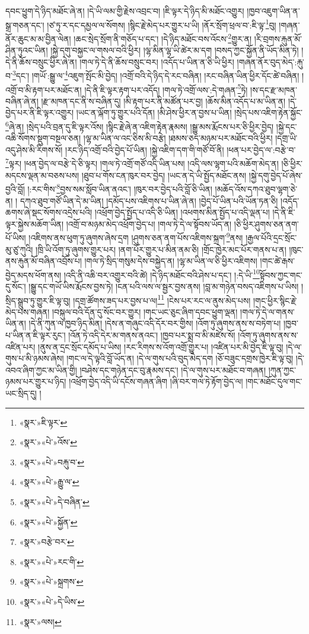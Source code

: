 དབང་ཕྱུག་དེ་ཉིད་མཐོང་ཞེ་ན། །དེ་ཡི་ལམ་གྱི་རྗེས་འབྲང་བ། །ཇི་ལྟར་དེ་ཉིད་མི་མཐོང་འགྱུར། །ཁྱབ་འཇུག་ཡིན་ན་སྒྲ་གཅན་དང་། །ཙ་ཏུ་ར་དང་དམྱལ་ལ་སོགས། །སྙིང་རྗེ་མེད་པར་གྱུར་པ་ཡི། །ནོར་སྲོག་ཕྲལ་བ་:ཇི་ལྟ་\footnote{«སྣར་»ཇི་ལྟར་}བུ། །གཞན་ནོར་ཆུང་མ་མ་བྱིན་ལེན། །ཆང་སྲེད་སྲོག་ནི་གཅོད་པ་དང་། །དེ་ཉིད་མཐོང་བས་འོངས་\footnote{«སྣར་»«པེ་»འོས་}གྱུར་ན། །རི་བྲགས་རྐུན་མོ་ཤིན་ཏུའང་ཡིན། །སྐྱེ་དགུ་བསྐྱང་ལ་གསལ་བའི་ཕྱིར། །ལྷ་མིན་ལྷ་ཡི་ཚེར་མ་དག །བསད་ཀྱང་སྐྱོན་ནི་ཡོད་མིན་ཏེ། །དེ་ནི་ཆོས་བསྲུང་ཕྱིར་ཞེ་ན། །གལ་ཏེ་དེ་ནི་ཆོས་བསྲུང་བར། །འདོད་པ་ཡིན་ན་ཅི་ཡི་ཕྱིར། །གཞན་ནོར་བུད་མེད་:རྐུ་བ་\footnote{«སྣར་»«པེ་»བརྐུ་བ་}དང་། །གཡོ་:སྒྱུ་ལ་\footnote{«སྣར་»«པེ་»རྒྱུ་ལ་}འཇུག་སྤོང་མི་བྱེད། །འགྲོ་བའི་དེ་ཉིད་དེ་རང་བཞིན། །རང་བཞིན་ཡིན་ཕྱིར་དོང་ཚེ་བཞིན། །འགྲོ་བ་མི་རྟག་པར་མཐོང་ན། །དེ་ནི་ཇི་ལྟར་རྟག་པར་འདོད། །གལ་ཏེ་འགྲོ་ལས་:དེ་གཞན་\footnote{«སྣར་»«པེ་»དེ་བཞིན་}ཏེ། །ས་དང་རྫ་མཁན་བཞིན་ཞེ་ན། །རྫ་མཁན་དང་ནི་ས་བཞིན་དུ། །མི་རྟག་པར་ནི་མཚོན་པར་བྱ། །ཆོས་མིན་འདོད་པ་མ་ཡིན་ན། །དེ་བྱེད་པར་ནི་ཇི་ལྟར་འགྱུར། །ཡང་ན་ལྐོག་ཏུ་གྱུར་པའི་དོན། །མི་ཤེས་ཕྱིར་ན་བྱས་པ་ཡིན། །སྲེད་པས་འཇིག་རྟེན་སྐྱོང་\footnote{«སྣར་»«པེ་»སྐྱོན་}ཞེ་ན། །སྲེད་པའི་བྲན་དུ་ཇི་ལྟར་འོས། །སྙིང་རྗེ་ཞེ་ན་འཇིག་རྟེན་རྣམས། །སྒྱུ་མས་རྨོངས་པར་ཅི་ཕྱིར་བྱེད། །སྐྱེ་དང་འཆི་སོགས་སྡུག་བསྔལ་ཅན། །ལྷ་མ་ཡིན་ལ་འང་ཅིས་མི་བརྩེ། །ཐམས་ཅད་མཉམ་པར་མཐོང་བའི་ཕྱིར། །དགྲ་ཡི་འདུ་ཤེས་མི་རིགས་སོ། །རང་ཉིད་འགྲོ་བའི་བྱེད་པོ་ཡིན། །སྐྱེ་འཇིག་དག་གི་གཙོ་བོ་ནི། །ཕན་པར་བྱེད་ལ་:བརྩེ་བ་\footnote{«སྣར་»བརྩེ་བར་}ལྟར། །ཕན་བྱེད་ལ་བརྩེ་དེ་ཅི་ལྟར། །གལ་ཏེ་འགྲོ་གཙོ་འདི་ཡིན་པས། །འདི་ལས་ལྷག་པའི་མཆོག་མེད་ན། །ཅི་ཕྱིར་མདངས་ལྡན་མ་བཅས་པས། །ཐུབ་པ་གོས་ངན་ཁུར་བར་བྱེད། །ཡང་ན་དེ་ཡི་སྤྱོད་མཐོང་ནས། །སྐྱེ་དགུ་བྱེད་པོ་ཞེས་བྱའི་བློ། །:རང་གིས་\footnote{«སྣར་»«པེ་»རང་གི་}བྱས་སམ་སློབ་ཡིན་ནའང་། །ཁུར་བར་བྱེད་པའི་བློ་ཅི་ཡིན། །མཆོད་འོས་དཀའ་ཐུབ་ལྷག་ཅེ་ན། །
དཀའ་ཐུབ་གཙོ་ཡིན་དེ་མ་ཡིན། །དམོད་པས་འཇིགས་པ་ཡིན་ཞེ་ན། །བྱེད་པོ་ཡིན་པའི་ཡོན་ཏན་ཅི། །འདོད་ཆགས་ཞེ་སྡང་སོགས་འདྲེས་པའི། །འཕྲོག་བྱེད་སྤྱོད་པ་འདི་ཅི་ཡིན། །འཕགས་མིན་སྤྱོད་པ་འདི་ལྡན་པ། །དེ་ནི་ཇི་ལྟར་སྐྱེས་མཆོག་ཡིན། །འགྲོ་བ་མཉམ་མེད་འཕྲོག་བྱེད་པ། །གལ་ཏེ་དེ་ལ་སྟོབས་ཡོད་ན། །ཅི་ཕྱིར་ཤུགས་ཅན་ནག་པོ་ཡིས། །འཇིགས་ནས་ཕུག་ཏུ་ཞུགས་ཞེས་དྲག །ཤུགས་ཅན་ནག་པོས་འཇིགས་སྐྲག་\footnote{«སྣར་»«པེ་»སྐྲགས་}ནས། །རྒྱལ་པོའི་དྲང་སྲོང་མུ་ཙུ་ཀུའི། །ཁྲི་ཡི་འོག་ཏུ་ཞུགས་གྱུར་པར། །ནག་པོར་གྱུར་པ་མིན་ནམ་ཅི། །གྲོང་ཁྱེར་མང་པོར་གནས་པ་ན། །ཁུང་ནས་རྐུན་མོ་བཞིན་འབྲོས་པ། །གལ་ཏེ་སྲིད་གསུམ་དེས་བསྐྱེད་ན། །ལྷ་མ་ཡིན་ལ་ཅི་ཕྱིར་འཇིགས། །གང་ཚེ་རྒས་བྱེད་མདས་ཕོག་ནས། །འདི་ནི་འཆི་བར་འགྱུར་བའི་ཚེ། །དེ་ཉིད་མཐོང་བའི་ཤེས་པ་དང་། །:དེ་ཡི་\footnote{«སྣར་»«པེ་»དེ་ཡིས་}སྟོབས་ཀྱང་གང་དུ་སོང་། །སྒྱུ་དང་གཡོ་ཡིས་རྨོངས་བྱས་ཏེ། །ངན་པའི་ལས་ལ་སྦྱར་བྱས་ནས། །བླ་མ་གཉེན་བསད་འཇིགས་པ་ཡིས། །སྲིད་སྒྲུབ་ཏུ་གྱུར་ཇི་ལྟ་བུ། །དགྲ་ཚོགས་ཟད་པར་བྱས་པ་ལ།\footnote{«སྣར་»ལས།} །ངེས་པར་རང་ལ་ནུས་མེད་པས། །གང་ཕྱིར་སྙིང་རྗེ་མེད་པས་གཞན། །བསྐུལ་བའི་དོན་དུ་སོང་བར་གྱུར། །གང་ཡང་ཅུང་ཞིག་དབང་ཕྱུག་ལྡན། །གལ་ཏེ་དེ་ལ་གནས་ཡིན་ན། །དེ་ནི་ཀུན་ལ་ཁྱབ་ཉིད་མིན། །དེས་ན་གཞུང་འདི་དོར་བར་གྱིས། །འོག་ཏུ་ཞུགས་ནས་ས་བཏེག་པ། །ཁྱབ་པ་ཡིན་ན་ཇི་ལྟར་རུང་། །འོན་ཏེ་འདི་དེར་མ་གནས་ནའང་། །ཁྱབ་པར་སྨྲ་བ་མི་མཛེས་སོ། །འོག་ཏུ་ཞུགས་ནས་ས་འཛིན་པར། །ནུས་ན་དྲང་སྲོང་དམོད་པ་ཡིས། །རང་རིགས་ས་འོག་འགྲོ་གྱུར་པ། །འཛིན་པར་མི་བྱེད་ཇི་ལྟ་བུ། །དེ་ལ་གུས་པ་མི་ཉམས་ཞེས། །གང་ལ་དེ་ལྟའི་བློ་ཡོད་ན། །དེ་ལ་གུས་པའི་བུད་མེད་དག །ཅོ་བཟུང་དགྲས་ཁྱེར་ཇི་ལྟ་བུ། །དེ་འབའ་ཞིག་ཀྱང་མ་ཡིན་གྱི། །བཤེས་དང་གཉེན་དང་བུ་རྣམས་དང་། །དེ་ལ་གུས་པར་མཐོང་བ་གཞན། །ཀུན་ཀྱང་ཉམས་པར་གྱུར་པ་ཉིད། །འཕྲོག་བྱེད་འདི་ཡི་དངོས་གཞན་ཞིག །ཞི་བར་གལ་ཏེ་རྟོག་བྱེད་ལ། །གང་མཐོང་དུལ་གང་ཡང་སྲིད་དུ། །
